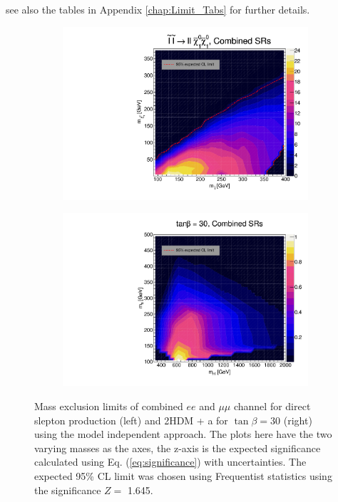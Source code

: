 \documentclass[12pt, a4paper]{book}
\begin{document}
see also the tables in Appendix \ref{chap:Limit_Tabs} for further details.
\begin{figure}[!ht]
	\centering
	\begin{subfigure}[b]{0.49\textwidth}
      \centering
      \includegraphics[width=1\textwidth]{Limits/Model_independent/SlepSlep/SlepSlep_ll.pdf}
   \end{subfigure}
   \hfill
   \begin{subfigure}[b]{0.49\textwidth}
      \centering
      \includegraphics[width=1\textwidth]{Limits/Model_independent/2HDM/2HDM_ll_tb30.pdf}
   \end{subfigure}
   \caption[Mass exclusion limits of combined $ee$ and $\mu\mu$ channel for direct slepton production and 2HDM + a using the model independent approach]{
      Mass exclusion limits of combined $ee$ and $\mu\mu$ channel for direct slepton production (left) and 2HDM + a for $\tan\beta=30$ (right) using the model independent approach. The plots here have the two varying masses as the axes, the z-axis is the expected significance calculated using Eq. (\ref{eq:significance}) with uncertainties. The expected 95\% CL limit was chosen using Frequentist statistics using the significance $Z=$ 1.645.   
}
\end{figure}
\end{document}
